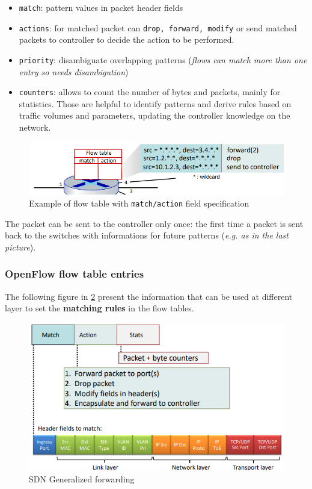 \documentclass[10pt,a4paper]{report}
\theoremstyle{definition}
\begin{document}
\begin{itemize}
	\item 
	\texttt{match}: pattern values in packet header fields
	\item 
	\texttt{actions}: for matched packet can \texttt{drop, forward, modify} or send matched packets to controller to decide the action to be performed.
	\item 
	\texttt{priority}: disambiguate overlapping patterns (\textit{flows can match more than one entry so needs disambigution})
	\item 
	\texttt{counters}: allows to count the number of bytes and packets, mainly for statistics. Those are helpful to identify patterns and derive rules based on traffic volumes and parameters, updating the controller knowledge on the network.
\end{itemize}

\begin{figure}[h!]
	\centering\includegraphics[scale=0.50]{images/Pasted image 20230322114152.png}
	\caption{Example of flow table with \texttt{match/action} field specification}
	\label{header-fields}
\end{figure}
The packet can be sent to the controller only once: the first time a packet is sent back to the switches with informations for future patterns (\textit{e.g. as in the last picture}).
\subsubsection{OpenFlow flow table entries}\label{sec:openflow-flow-table-entries}
The following figure in \ref{openflow-entry} present the information that can be used at different layer to set the \textbf{matching rules} in the flow tables.
\begin{figure}[h]
	\centering\includegraphics[scale=0.50]{images/Pasted image 20230322114224.png}
	\caption{SDN Generalized forwarding}
	\label{openflow-entry}
\end{figure}
\end{document}

